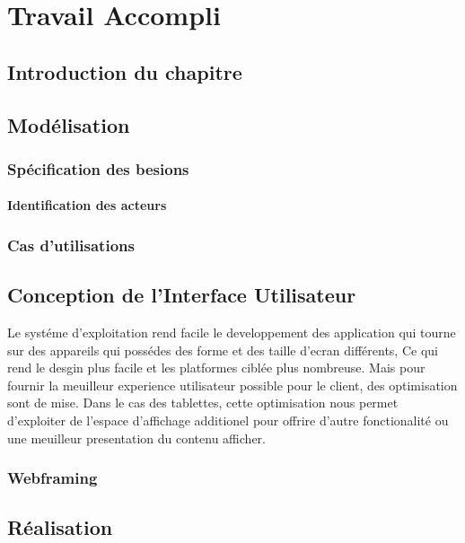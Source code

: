 
\chapter{Travail Accompli}
\section{Introduction du chapitre}

\section{Modélisation}
\subsection{Spécification des besions}

\subsubsection{Identification des acteurs}

\subsection{Cas d'utilisations}

\section{Conception de l'Interface Utilisateur}
Le systéme d'exploitation \android rend facile le developpement des application qui tourne sur des appareils qui possédes des forme et des taille d'ecran différents, Ce qui rend le desgin plus facile et les platformes ciblée plus nombreuse. %
Mais pour fournir la meuilleur experience utilisateur possible pour le client, des optimisation sont de mise. Dans le cas des tablettes, cette optimisation nous permet d'exploiter de l'espace d'affichage additionel pour offrire d'autre fonctionalité ou une meuilleur presentation du contenu afficher.

\subsection{Webframing}

\section{Réalisation}
